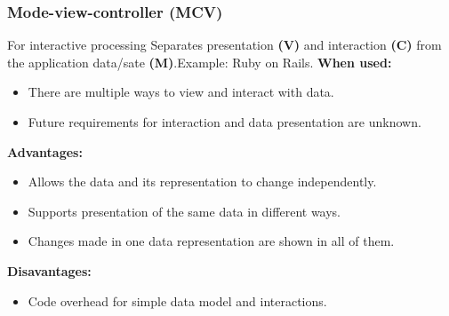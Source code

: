 \documentclass[../ESOF_notes.tex]{subfiles}
\begin{document}
\subsubsection{Mode-view-controller (MCV)}
For interactive processing
Separates presentation \textbf{(V)} and interaction \textbf{(C)} from the application data/sate \textbf{(M)}.\newline Example: Ruby on Rails.\newline\newline
\textbf{When used:}
\begin{itemize}
    \item There are multiple ways to view and interact with data.
    \item Future requirements for interaction and data presentation are unknown.
\end{itemize} \textbf{Advantages:}
\begin{itemize}
    \item Allows the data and its representation to change independently.
    \item Supports presentation of the same data in different ways.
    \item Changes made in one data representation are shown in all of them.
\end{itemize}
\textbf{Disavantages:}
\begin{itemize}
    \item Code overhead for simple data model and interactions.
\end{itemize}
\end{document}
